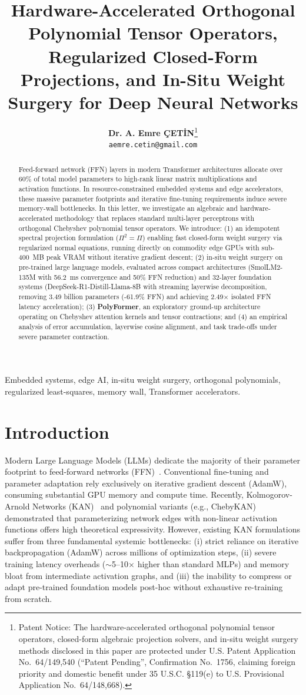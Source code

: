 \documentclass[journal,lettersize]{IEEEtran}
\title{Hardware-Accelerated Orthogonal Polynomial Tensor Operators, Regularized Closed-Form Projections, and In-Situ Weight Surgery for Deep Neural Networks}
\author{
    \textbf{Dr. A. Emre \c{C}ET\.{I}N}\thanks{Patent Notice: The hardware-accelerated orthogonal polynomial tensor operators, closed-form algebraic projection solvers, and in-situ weight surgery methods disclosed in this paper are protected under U.S. Patent Application No.~64/149,540 (``Patent Pending'', Confirmation No.~1756, claiming foreign priority and domestic benefit under 35 U.S.C. \S 119(e) to U.S. Provisional Application No.~64/148,668).}\\
    \texttt{aemre.cetin@gmail.com}
}
\begin{document}
\maketitle

\begin{abstract}
Feed-forward network (FFN) layers in modern Transformer architectures allocate over 60\% of total model parameters to high-rank linear matrix multiplications and activation functions. In resource-constrained embedded systems and edge accelerators, these massive parameter footprints and iterative fine-tuning requirements induce severe memory-wall bottlenecks. In this letter, we investigate an algebraic and hardware-accelerated methodology that replaces standard multi-layer perceptrons with orthogonal Chebyshev polynomial tensor operators. We introduce: (1) an idempotent spectral projection formulation ($\Pi^2 = \Pi$) enabling fast closed-form weight surgery via regularized normal equations, running directly on commodity edge GPUs with sub-400~MB peak VRAM without iterative gradient descent; (2) in-situ weight surgery on pre-trained large language models, evaluated across compact architectures (SmolLM2-135M with 56.2~ms convergence and 50\% FFN reduction) and 32-layer foundation systems (DeepSeek-R1-Distill-Llama-8B with streaming layerwise decomposition, removing 3.49 billion parameters (-61.9\% FFN) and achieving 2.49$\times$ isolated FFN latency acceleration); (3) \textbf{PolyFormer}, an exploratory ground-up architecture operating on Chebyshev attention kernels and tensor contractions; and (4) an empirical analysis of error accumulation, layerwise cosine alignment, and task trade-offs under severe parameter contraction.
\end{abstract}

\begin{IEEEkeywords}
Embedded systems, edge AI, in-situ weight surgery, orthogonal polynomials, regularized least-squares, memory wall, Transformer accelerators.
\end{IEEEkeywords}

\section{Introduction}
Modern Large Language Models (LLMs) dedicate the majority of their parameter footprint to feed-forward networks (FFN)~\cite{vaswani2017attention,shazeer2020glu,touvron2023llama}. Conventional fine-tuning and parameter adaptation rely exclusively on iterative gradient descent (AdamW), consuming substantial GPU memory and compute time. Recently, Kolmogorov-Arnold Networks (KAN)~\cite{liu2024kan} and polynomial variants (e.g., ChebyKAN) demonstrated that parameterizing network edges with non-linear activation functions offers high theoretical expressivity. However, existing KAN formulations suffer from three fundamental systemic bottlenecks: (i) strict reliance on iterative backpropagation (AdamW) across millions of optimization steps, (ii) severe training latency overheads ($\sim$5--10$\times$ higher than standard MLPs) and memory bloat from intermediate activation graphs, and (iii) the inability to compress or adapt pre-trained foundation models post-hoc without exhaustive re-training from scratch.
\end{document}
